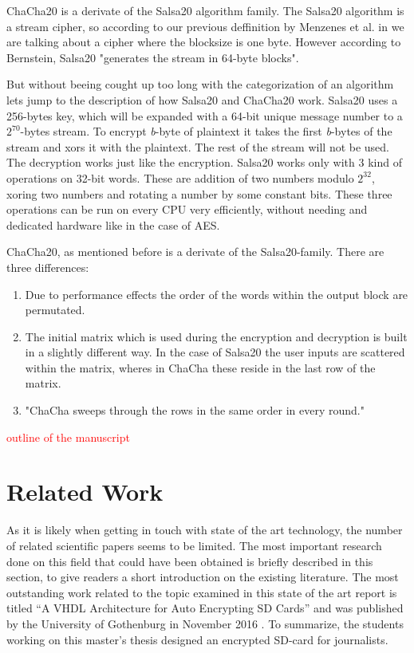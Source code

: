 \documentclass[12pt,a4paper,titlepage,oneside]{scrartcl}
\newcommand\todo[1]{\textcolor{red}{#1}}
\begin{document}
ChaCha20 is a derivate of the Salsa20 algorithm family. 
The Salsa20 algorithm is a stream cipher, so according to our previous deffinition by Menzenes et al. in \cite{menezes1996handbook} we are talking about a cipher where the blocksize is one byte.
However according to Bernstein, Salsa20 "generates the stream in 64-byte blocks". \cite{bernstein2008salsa20}

But without beeing cought up too long with the categorization of an algorithm lets jump to the description of how Salsa20 and ChaCha20 work.
Salsa20 uses a 256-bytes key, which will be expanded with a 64-bit unique message number to a \begin{math} 2^{70} \end{math}-bytes stream.
To encrypt \textit{b}-byte of plaintext it takes the first \textit{b}-bytes of the stream and xors it with the plaintext.
The rest of the stream will not be used.
The decryption works just like the encryption.
Salsa20 works only with 3 kind of operations on 32-bit words.
These are addition of two numbers modulo \begin{math} 2^{32} \end{math}, xoring two numbers and rotating a number by some constant bits.
These three operations can be run on every CPU very efficiently, without needing and dedicated hardware like in the case of AES. \cite{bernstein2008salsa20}

ChaCha20, as mentioned before is a derivate of the Salsa20-family.
There are three differences:
\begin{enumerate}
  \item Due to performance effects the order of the words within the output block are permutated.
  \item The initial matrix which is used during the encryption and decryption is built in a slightly different way.
    In the case of Salsa20 the user inputs are scattered within the matrix, wheres in ChaCha these reside in the last row of the matrix.
  \item "ChaCha sweeps through the rows in the same order in every round."
\end{enumerate}
\cite{bernstein2008chacha}

\todo{outline of the manuscript}


\newpage
\section{Related Work}
As it is likely when getting in touch with state of the art technology, the number of related scientific papers seems to be limited.
The most important research done on this field that could have been obtained is briefly described in this section, to give readers a short introduction on the existing literature. 
The most outstanding work related to the topic examined in this state of the art report is titled ``A VHDL Architecture for Auto Encrypting SD Cards'' and was published by the University of Gothenburg in November 2016 \cite{Davidsson2016}.
To summarize, the students working on this master's thesis designed an encrypted SD-card for journalists.
\end{document}
